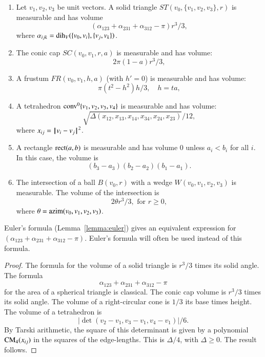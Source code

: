 \begin{lemma} 
\begin{enumerate} 
 \item {} Let $v_1,v_2,v_3$ be unit vectors.
   A solid triangle $ST(v_0,\{v_1,v_2,v_3\},r)$ is measurable and has volume
   $$
   (\alpha_{123}+\alpha_{231}+\alpha_{312}-\pi)r^3/3,
   $$
   where $\alpha_{ijk} = \operatorname{dih}_V(\{v_0,v_i\},\{v_j,v_k\})$.
  \item {} The conic cap $SC(v_0,v_1,r,a)$ is measurable and has volume:
   $$
    2\pi(1-a) r^3/3,
   $$
 \item {} A frustum $FR(v_0,v_1,h,a)$ (with $h'=0$) 
is measurable and has volume:
   $$
   \pi (t^2-h^2) h/3,\quad h = t a, 
   $$
 \item{} A tetrahedron ${\operatorname{conv}}^0\{v_1,v_2,v_3,v_4\}$ is measurable and has volume:
   $$
   \sqrt{\Delta(x_{12},x_{13},x_{14},x_{34},x_{24},x_{23})}/12,
   $$
   where $x_{ij} = {\hskip0.1em|\hskip-0.15em|\hskip0.1em}v_i - v_j{\hskip0.1em|\hskip-0.15em|\hskip0.1em}^2$.
\item{} A rectangle ${\operatorname{rect}}(a,b)$ is measurable and
has volume $0$ unless $a_i<b_i$ for all $i$.  In this case, the
volume is
$$(b_3-a_3)(b_2-a_2)(b_1-a_1).$$
 \item{} The intersection of a ball $B(v_0,r)$ with a wedge
 $W(v_0,v_1,v_2,v_3)$ is measurable.  The volume of the intersection
is 
   $$
   2 \theta r^3/3,\text{ for } r \ge 0,
   $$
where $\theta = {\operatorname{azim}}(v_0,v_1,v_2,v_3)$.

\end{enumerate}
\end{lemma}

Euler's formula (Lemma~\ref{lemma:euler}) gives an
equivalent expression for $(\alpha_{123}+\alpha_{231}+\alpha_{312}-\pi)$.
Euler's formula will often be used instead of this formula.

\begin{proof}
The formula for the volume of a solid triangle is $r^3/3$ times
its solid angle.  The formula 
   $$\alpha_{123}+\alpha_{231}+\alpha_{312}-\pi$$
for the area of a spherical triangle is classical.    
The conic cap volume is
$r^3/3$ times its solid angle.  
The volume of a right-circular cone is $1/3$ its base times height.
The volume of a tetrahedron is
   $$|\det(v_2-v_1,v_3-v_1,v_4-v_1)|/6.$$
By Tarski arithmetic, %
the square of this determinant is given by a polynomial
${\operatorname{CM}}_4(x_{ij})$ in the squares of the edge-lengths. This is
$\Delta/4$, with $\Delta\ge0$.  The result follows.
\end{proof}



